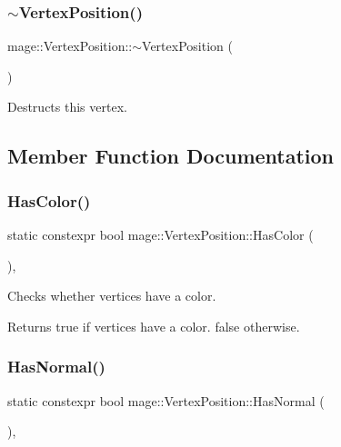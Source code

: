 \subsubsection{\texorpdfstring{$\sim$\+Vertex\+Position()}{~VertexPosition()}}
{\footnotesize\ttfamily mage\+::\+Vertex\+Position\+::$\sim$\+Vertex\+Position (\begin{DoxyParamCaption}{ }\end{DoxyParamCaption})\hspace{0.3cm}{\ttfamily [default]}}

Destructs this vertex. 

\subsection{Member Function Documentation}
\hypertarget{structmage_1_1_vertex_position_a93f07ce2967b0ae2d22dede08b4fd3e0}{}\label{structmage_1_1_vertex_position_a93f07ce2967b0ae2d22dede08b4fd3e0} 
\subsubsection{\texorpdfstring{Has\+Color()}{HasColor()}}
{\footnotesize\ttfamily static constexpr bool mage\+::\+Vertex\+Position\+::\+Has\+Color (\begin{DoxyParamCaption}{ }\end{DoxyParamCaption})\hspace{0.3cm}{\ttfamily [static]}, {\ttfamily [noexcept]}}

Checks whether vertices have a color.

\begin{DoxyReturn}{Returns}
{\ttfamily true} if vertices have a color. {\ttfamily false} otherwise. 
\end{DoxyReturn}
\hypertarget{structmage_1_1_vertex_position_ac67b22c20ae993660be823e8e1d9b52d}{}\label{structmage_1_1_vertex_position_ac67b22c20ae993660be823e8e1d9b52d} 
\subsubsection{\texorpdfstring{Has\+Normal()}{HasNormal()}}
{\footnotesize\ttfamily static constexpr bool mage\+::\+Vertex\+Position\+::\+Has\+Normal (\begin{DoxyParamCaption}{ }\end{DoxyParamCaption})\hspace{0.3cm}{\ttfamily [static]}, {\ttfamily [noexcept]}}

